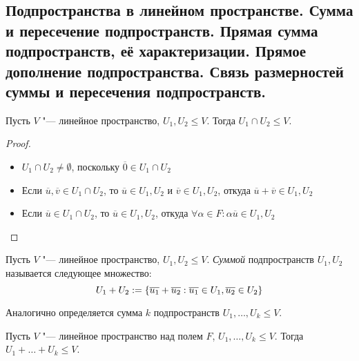 \subsection{Подпространства в линейном пространстве. Сумма и пересечение подпространств. Прямая сумма подпространств, её характеризации. Прямое дополнение подпространства. Связь размерностей суммы и пересечения подпространств.}

    \begin{proposition}
    	Пусть $V$ "--- линейное пространство, $U_1, U_2 \le V$. Тогда $U_1 \cap U_2 \le V$.
    \end{proposition}
    
    \begin{proof}~
    	\begin{itemize}
    		\item $U_1 \cap U_2 \ne \emptyset$, поскольку $\overline{0} \in U_1 \cap U_2$
    		\item Если $\overline{u}, \overline{v} \in U_1 \cap U_2$, то $\overline{u} \in U_1, U_2$ и $\overline{v} \in U_1, U_2$, откуда $\overline{u} + \overline{v} \in U_1, U_2$
    		\item Если $\overline{u} \in U_1 \cap U_2$, то $\overline{u} \in U_1, U_2$, откуда $\forall \alpha \in F: \alpha\overline{u} \in U_1, U_2$\qedhere
    	\end{itemize}
    \end{proof}
    
    \begin{definition}
    	Пусть $V$ "--- линейное пространство, $U_1, U_2 \le V$. \textit{Суммой} подпространств $U_1, U_2$ называется следующее множество:
    	\[U_1 + U_2 := \{\overline{u_1} + \overline{u_2}: \overline{u_1} \hm{\in} U_1, \overline{u_2} \in U_2\}\]
    	
    	Аналогично определяется сумма $k$ подпространств $U_1, \dotsc, U_k \le V$.
    \end{definition}
    
    \begin{proposition}
    	Пусть $V$ "--- линейное пространство над полем $F$, $U_1, \dots, U_k \le V$. Тогда $U_1 + \dots + U_k \le V$.
    \end{proposition}
    
